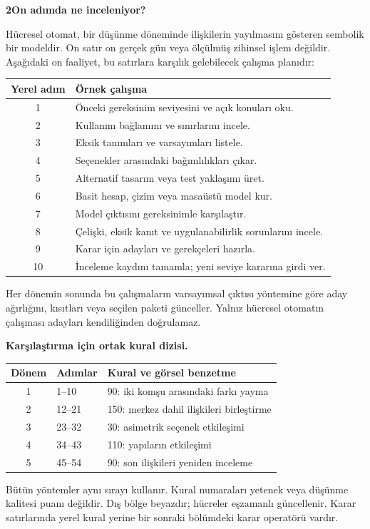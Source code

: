 \documentclass[11pt,a4paper]{article}
\newcommand{\heading}[2]{{\sffamily\small\color{blue!40!black}#1}\par{\sffamily\LARGE\bfseries#2}\par\vspace{3mm}}
\newcommand{\page}[2]{\newpage\heading{#1}{#2}}
\begin{document}
\page{Düşünme dönemlerinin anlamı}{2\quad On adımda ne inceleniyor?}
Hücresel otomat, bir düşünme döneminde ilişkilerin yayılmasını gösteren
sembolik bir modeldir. On satır on gerçek gün veya ölçülmüş zihinsel işlem
değildir. Aşağıdaki on faaliyet, bu satırlara karşılık gelebilecek çalışma planıdır:
\begin{center}\small\begin{tabular}{c p{128mm}}\toprule
Yerel adım & Örnek çalışma\\\midrule
1 & Önceki gereksinim seviyesini ve açık konuları oku.\\
2 & Kullanım bağlamını ve sınırlarını incele.\\
3 & Eksik tanımları ve varsayımları listele.\\
4 & Seçenekler arasındaki bağımlılıkları çıkar.\\
5 & Alternatif tasarım veya test yaklaşımı üret.\\
6 & Basit hesap, çizim veya masaüstü model kur.\\
7 & Model çıktısını gereksinimle karşılaştır.\\
8 & Çelişki, eksik kanıt ve uygulanabilirlik sorunlarını incele.\\
9 & Karar için adayları ve gerekçeleri hazırla.\\
10 & İnceleme kaydını tamamla; yeni seviye kararına girdi ver.\\\bottomrule
\end{tabular}\end{center}
Her dönemin sonunda bu çalışmaların varsayımsal çıktısı yöntemine göre
aday ağırlığını, kısıtları veya seçilen paketi günceller. Yalnız hücresel
otomatın çalışması adayları kendiliğinden doğrulamaz.

\textbf{Karşılaştırma için ortak kural dizisi.}
\begin{center}\begin{tabular}{cll}\toprule
Dönem & Adımlar & Kural ve görsel benzetme\\\midrule
1 & 1--10 & 90: iki komşu arasındaki farkı yayma\\
2 & 12--21 & 150: merkez dahil ilişkileri birleştirme\\
3 & 23--32 & 30: asimetrik seçenek etkileşimi\\
4 & 34--43 & 110: yapıların etkileşimi\\
5 & 45--54 & 90: son ilişkileri yeniden inceleme\\\bottomrule
\end{tabular}\end{center}
Bütün yöntemler aynı sırayı kullanır. Kural numaraları yetenek veya düşünme
kalitesi puanı değildir. Dış bölge beyazdır; hücreler eşzamanlı güncellenir.
Karar satırlarında yerel kural yerine bir sonraki bölümdeki karar operatörü vardır.
\end{document}
